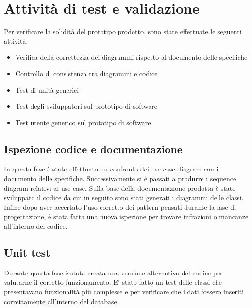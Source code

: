 \documentclass{article}
\begin{document}
\section{Attività di test e validazione}
Per verificare la solidità del prototipo prodotto, sono state effettuate le seguenti attività:
\begin{itemize}
	\item{Verifica della correttezza dei diagrammi rispetto al documento delle specifiche}
	\item{Controllo di consistenza tra diagrammi e codice}
	\item{Test di unità generici }
	\item{Test degli sviluppatori sul prototipo di software }
	\item{Test utente generico sul prototipo di software}
\end{itemize}
\subsection{Ispezione codice e documentazione}
\noindent
In questa fase è stato effettuato un confronto dei use case diagram con  il documento delle specifiche. Successivamente si è passati a produrre i sequence diagram relativi ai use case.
Sulla base della documentazione prodotta è stato sviluppato il codice da cui in seguito sono stati generati i diagrammi delle classi. Infine dopo aver accertato l'uso corretto dei pattern pensati durante la fase di progettazione, è stata fatta una nuova ispezione per trovare infrazioni o mancanze all'interno del codice.

\newpage

\subsection{Unit test}
Durante questa fase è stata creata una versione alternativa del codice per valutarne il corretto funzionamento. E' stato fatto un test delle classi che presentavano funzionalità più complesse  e per verificare che i dati fossero inseriti correttamente all'interno del database.
\end{document}
